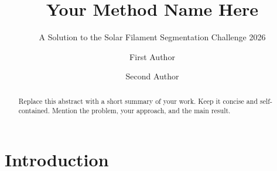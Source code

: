 %
%
%





\title{Your Method Name Here}
\subtitle{A Solution to the Solar Filament Segmentation Challenge 2026}

\author{First Author}

\author{Second Author}

\begin{abstract}
Replace this abstract with a short summary of your work. Keep it concise and
self-contained. Mention the problem, your approach, and the main result.
\end{abstract}

\maketitle

\section{Introduction}

